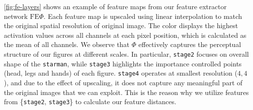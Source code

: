 \cref{fig:fe-layers} shows an example of feature maps from our feature extractor network $\text{FE} \Phi$. Each feature map is upscaled using linear interpolation to match the original spatial resolution of original image. The color displays the highest activation values across all channels at each pixel position, which is calculated as the mean of all channels. We observe that $\Phi$ effectively captures the perceptual structure of our figures at different scales. In particular, \texttt{stage2} focuses on overall shape of the \texttt{starman}, while \texttt{stage3} highlights the importance controlled points (head, legs and hands) of each figure. \texttt{stage4} operates at smallest resolution ($4, 4$), and due to the effect of upscaling, it does not capture any meaningful part of the original images that we can exploit. This is the reason why we utilize features from \{\texttt{stage2}, \texttt{stage3}\} to calculate our feature distances.

